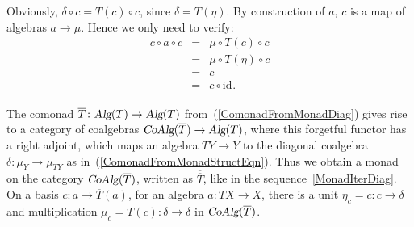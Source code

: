 \documentclass{LMCS}
\newenvironment{myproof}[1][Proof]{ \begin{trivlist}\item[\hskip \labelsep {\bfseries #1}]}{ \end{trivlist}}
\newcommand{\after}{\mathrel{\circ}}
\newcommand{\idmap}[1][]{\ensuremath{\mathrm{id}_{#1}}}
\newcommand{\Alg}{\textsl{Alg}\xspace}
\newcommand{\CoAlg}{\textsl{CoAlg}\xspace}
\begin{document}
\begin{myproof}
{\noindent Obviously, $\delta \after c = T(c) \after c$, since $\delta
= T(\eta)$. By construction of $a$, $c$ is a map of algebras $a
\rightarrow \mu$. Hence we only need to verify:
$$\begin{array}{rcl}
c \after a \after c
& = &
\mu \after T(c) \after c \\
& = &
\mu \after T(\eta) \after c \\
& = &
c \\
& = &
c \after \idmap.
\end{array}$$
}
\end{myproof}


The comonad $\overline{T}\colon\Alg(T)\rightarrow\Alg(T)$
from~(\ref{ComonadFromMonadDiag}) gives rise to a category of
coalgebras $\CoAlg(\overline{T})\rightarrow\Alg(T)$, where this
forgetful functor has a right adjoint, which maps an algebra
$TY\rightarrow Y$ to the diagonal coalgebra $\delta\colon\mu_{Y}
\rightarrow\mu_{TY}$ as in~(\ref{ComonadFromMonadStructEqn}).  Thus we
obtain a monad on the category $\CoAlg(\overline{T})$, written as
$\overline{\overline{T}}$, like in the
sequence~\eqref{MonadIterDiag}. On a basis $c\colon a\rightarrow
\overline{T}(a)$, for an algebra $a\colon TX\rightarrow X$, there is a
unit $\eta_{c} = c\colon c\rightarrow\delta$ and multiplication
$\mu_{c} = T(c)\colon \delta\rightarrow\delta$ in
$\CoAlg(\overline{T})$.
\end{document}
